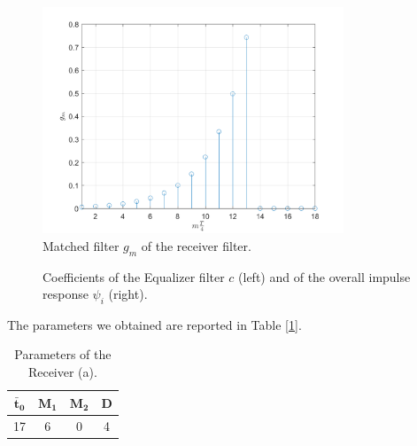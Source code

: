 \documentclass[a4paper, 12pt]{report}
\begin{document}
\begin{figure}[H]
	\centering
	\includegraphics[width=9cm]{images/RecA_gm}
	\caption{Matched filter $g_m$ of the receiver filter.}\label{gm_a}
\end{figure}

\begin{figure}[H]
	\centering
	\caption{Coefficients of the Equalizer filter $c$ (left) and of the overall impulse response $\psi_i$ (right).}\label{filters_a}
\end{figure}

The parameters we obtained are reported in Table [\ref{Tab_a}].

\begin{table}[H]
	\centering
	\begin{tabular}{c c c c}
		\toprule
		$\mathbf{\bar{t}_0}$ & $\mathbf{M_1}$ & $\mathbf{M_2}$ & \textbf{D}     \\
		\midrule
		17 & 6 & 0 & 4 \\
		\bottomrule			
	\end{tabular}
	\caption{Parameters of the Receiver (a).}
	\label{Tab_a}
\end{table}
\end{document}
